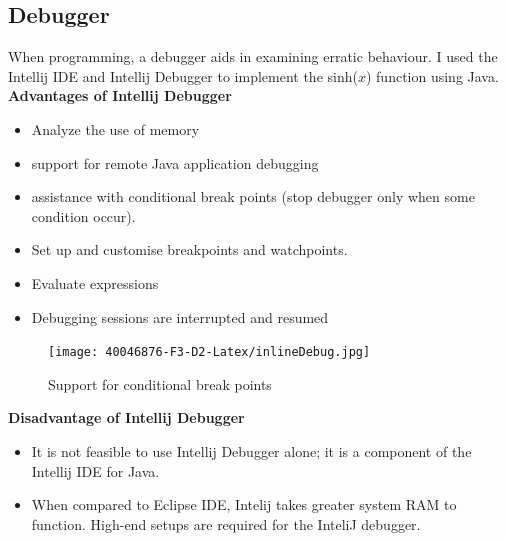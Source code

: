 \documentclass[
	12pt
]{article}
\begin{document}
\subsection{Debugger}
When programming, a debugger aids in examining erratic behaviour.
I used the Intellij IDE and Intellij Debugger to implement the sinh($x$) function using Java.\\
\newline\textbf{Advantages of Intellij Debugger}
\begin{itemize}
    \item Analyze the use of memory
    \item support for remote Java application debugging
    \item assistance with conditional break points (stop debugger only when some condition occur)\cite{debuggingtools}.
    \item Set up and customise breakpoints and watchpoints.
    \item Evaluate expressions
    \item Debugging sessions are interrupted and resumed

\end{itemize}
\begin{figure}[htp]
    \centering
    \texttt{[image: 40046876-F3-D2-Latex/inlineDebug.jpg]}
    \caption{Support for conditional break points}
    \label{Support for conditional break points}
\end{figure}
\newpage
\textbf{Disadvantage of Intellij Debugger}
\begin{itemize}
    \item It is not feasible to use Intellij Debugger alone; it is a component of the Intellij IDE for Java.
    \item When compared to Eclipse IDE, Intelij takes greater system RAM to function\cite{eclipsevsintelij}. High-end setups are required for the InteliJ debugger.
\end{itemize}
\end{document}
